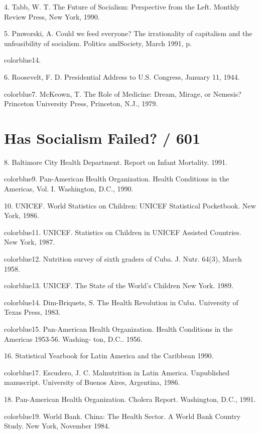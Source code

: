 	{\color{blue}4}. Tabb, W. T. The Future of Socialism: Perspective from the Left. Monthly Review Press, New York, 1990.


	{\color{blue}5}. Pmworski, A. Could we feed everyone? The irrationality of capitalism and the unfeasibility of socialism. Politics andSociety, March 1991, p.


	{color{blue}14}.


	{\color{blue}6}. Roosevelt, F. D. Presidential Address to U.S. Congress, January 11, 1944.


	{color{blue}7}. McKeown, T. The Role of Medicine: Dream, Mirage, or Nemesis? Princeton University Press, Princeton, N.J., 1979.


\section{Has Socialism Failed? / 601}


	{\color{blue}8}. Baltimore City Health Department. Report on Infant Mortality. 1991.


	{color{blue}9}. Pan-American Health Organization. Health Conditions in the Americas, Vol. I. Washington, D.C., 1990.


	{\color{blue}10}. UNICEF. World Statistics on Children: UNICEF Statistical Pocketbook. New York, 1986.


	{color{blue}11}. UNICEF. Statistics on Children in UNICEF Assisted Countries. New York, 1987.


	{color{blue}12}. Nutrition survey of sixth graders of Cuba. J. Nutr. 64(3), March 1958.


	{color{blue}13}. UNICEF. The State of the World’s Children New York. 1989.


	{color{blue}14}. Dim-Briquets, S. The Health Revolution in Cuba. University of Texas Press, 1983.


	{color{blue}15}. Pan-American Health Organization. Health Conditions in the Americas 1953-56. Washing- ton, D.C.. 1956.


	{\color{blue}16}. Statistical Yearbook for Latin America and the Caribbean 1990.


	{color{blue}17}. Escudero, J. C. Malnutrition in Latin America. Unpublished manuscript. University of Buenos Aires, Argentina, 1986.


	{\color{blue}18}. Pan-American Health Organization. Cholera Report. Washington, D.C., 1991.


	{color{blue}19}. World Bank. China: The Health Sector. A World Bank Country Study. New York, November 1984.


